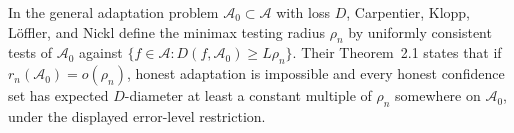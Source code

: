 In the general adaptation problem \(\mathcal A_0\subset\mathcal A\) with loss \(D\), Carpentier, Klopp, L\"offler, and Nickl define the minimax testing radius \(\rho_n\) by uniformly consistent tests of \(\mathcal A_0\) against \(\{f\in\mathcal A:D(f,\mathcal A_0)\ge L\rho_n\}\).  Their Theorem~2.1 states that if \(r_n(\mathcal A_0)=o(\rho_n)\), honest adaptation is impossible and every honest confidence set has expected \(D\)-diameter at least a constant multiple of \(\rho_n\) somewhere on \(\mathcal A_0\), under the displayed error-level restriction.